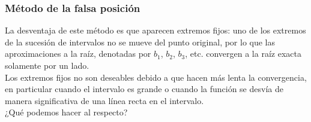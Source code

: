 \begin{frame}[fragile]
\frametitle{M\'{e}todo de la falsa posici\'{o}n}
\begin{center}
\end{center}
\end{frame}
\begin{frame}
La desventaja de este m\'{e}todo es que aparecen extremos fijos: uno de los extremos de la sucesi\'{o}n de intervalos no se mueve del punto original, por lo que las aproximaciones a la raíz, denotadas por $b_{1}$, $b_{2}$, $b_{3}$, etc. convergen a la ra\'{i}z exacta solamente por un lado.
\\
\bigskip
Los extremos fijos no son deseables debido a que hacen m\'{a}s lenta la convergencia, en particular cuando el intervalo es grande o cuando la funci\'{o}n
se desv\'{i}a de manera significativa de una l\'{i}nea recta en el intervalo.
\\
\bigskip
¿Qu\'{e} podemos hacer al respecto?
\end{frame}
